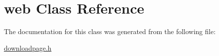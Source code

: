 \hypertarget{classweb}{}\section{web Class Reference}
\label{classweb}


The documentation for this class was generated from the following file\+:\begin{DoxyCompactItemize}
\item 
\mbox{\hyperlink{downloadpage_8h}{downloadpage.\+h}}\end{DoxyCompactItemize}
